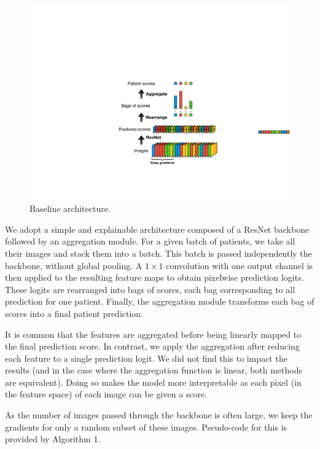 \documentclass[final]{cvpr}
\begin{document}
	\begin{figure}[h!]
		\begin{center}
			\includegraphics[width=0.9\linewidth]{fig/graphic2.pdf}
		\end{center}
		\caption{Baseline architecture.}
		\label{fig:overview}
	\end{figure}

	We adopt a simple and explainable architecture composed of a ResNet \cite{resnet} backbone followed by an aggregation module.
	For a given batch of patients, we take all their images and stack them into a batch.
	This batch is passed independently the backbone, without global pooling. 
	A $1\times 1$ convolution with one output channel is then applied to the resulting feature maps to obtain pixelwise prediction logits.
	These logits are rearranged into bags of scores, each bag corresponding to all  prediction for one patient.
	Finally, the aggregation module transforms each bag of scores into a final patient prediction.
	
	It is common that the features are aggregated before being linearly mapped to the final prediction score.
	In contrast, we apply the aggregation after reducing each feature to a single prediction logit. We did not find this to impact the results (and in the case where the aggregation function is linear, both methods are equivalent). Doing so makes the model more interpretable as each pixel (in the feature space) of each image can be given a score. 
	

	As the number of images passed through the backbone is often large, we keep the gradients for only a random subset of these images. Pseudo-code for this is provided by Algorithm 1.
\end{document}
